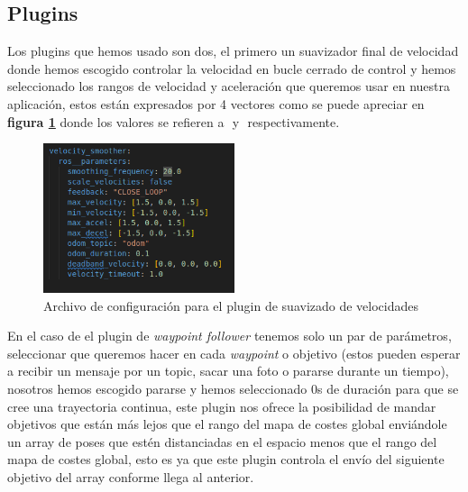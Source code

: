 \subsection{Plugins}
Los plugins que hemos usado son dos, el primero un suavizador final de velocidad donde hemos escogido controlar la velocidad en bucle cerrado de control y 
hemos seleccionado los rangos de velocidad y aceleración que queremos usar en nuestra aplicación, estos están expresados por 4 vectores como se 
puede apreciar en \textbf{figura \ref{fig:suavizado_vel}} donde los valores se refieren a \begin{math}[\dot{X},\dot{Y},\dot{\theta_{z}}]\end{math} 
 y \begin{math}[\ddot{X}, \ddot{Y}, \ddot{\theta_{z}}] \end{math} respectivamente.

\begin{figure}[H]
    \centering
    \includegraphics[width=0.5\textwidth]{images/velocity_smoother_params.png}
    \caption{Archivo de configuración para el plugin de suavizado de velocidades}
    \label{fig:suavizado_vel}
\end{figure}

En el caso de el plugin de \textit{waypoint follower} tenemos solo un par de parámetros, seleccionar que queremos hacer en cada \textit{waypoint} o 
objetivo (estos pueden esperar a recibir un mensaje por un topic, sacar una foto o pararse durante un tiempo), nosotros hemos escogido pararse y hemos seleccionado 0s de 
duración para que se cree una trayectoria continua, este plugin nos ofrece la posibilidad de mandar objetivos que están más lejos que el rango del 
mapa de costes global enviándole un array de poses que estén distanciadas en el espacio menos que el rango del mapa de costes global, esto es ya 
que este plugin controla el envío del siguiente objetivo del array conforme llega al anterior.

